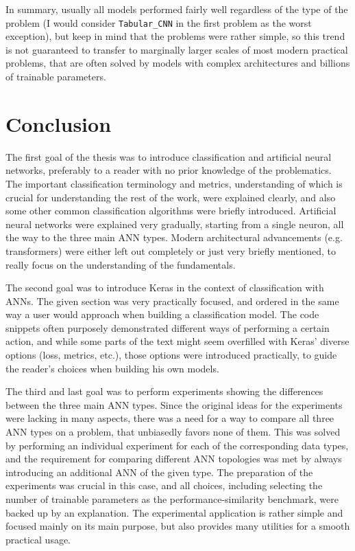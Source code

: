 In summary, usually all models performed fairly well regardless of the type of the problem
(I would consider \texttt{Tabular\_CNN} in the first problem as the worst exception), but keep in mind
that the problems were rather simple, so this trend is not guaranteed to transfer to marginally larger scales
of most modern practical problems, that are often solved by models with complex architectures and 
billions of trainable parameters.




\chapter{Conclusion}
\label{conclusion}
The first goal of the thesis was to introduce classification and artificial neural networks,
preferably to a reader with no prior knowledge of the problematics.
The important classification terminology and metrics, understanding of which is crucial for understanding the rest of the work,
were explained clearly, and also some other common classification algorithms were briefly introduced.
Artificial neural networks were explained very gradually, starting from a single neuron, all the way to the
three main ANN types. Modern architectural advancements (e.g. transformers) were either left out completely or
just very briefly mentioned, to really focus on the understanding of the fundamentals.

The second goal was to introduce Keras in the context of classification with ANNs.
The given section was very practically focused, and ordered in the same way a user would approach when building
a classification model. The code snippets often purposely demonstrated different ways of performing a certain action,
and while some parts of the text might seem overfilled with Keras' diverse options (loss, metrics, etc.),
those options were introduced practically, to guide the reader's choices when building his own models.

The third and last goal was to perform experiments showing the differences between the three main ANN types.
Since the original ideas for the experiments were lacking in many aspects, there was a need for a way to compare
all three ANN types on a problem, that unbiasedly favors none of them. This was solved by performing an individual
experiment for each of the corresponding data types, and the requirement for comparing different ANN topologies was met
by always introducing an additional ANN of the given type. The preparation of the experiments was crucial in this case,
and all choices, including selecting the number of trainable parameters as the performance-similarity benchmark,
were backed up by an explanation. The experimental application is rather simple and focused mainly on its main purpose,
but also provides many utilities for a smooth practical usage.

